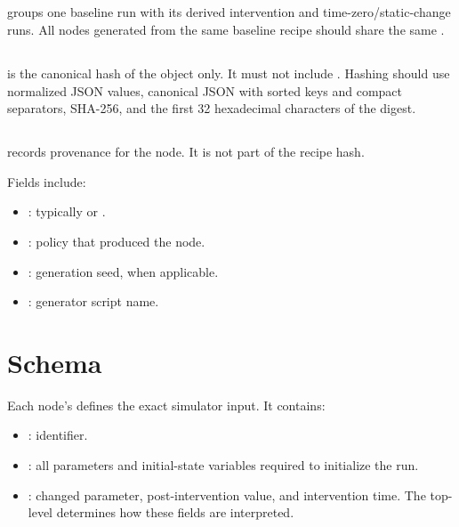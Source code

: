 \documentclass[11pt]{article}
\begin{document}
\subsection*{\texorpdfstring{}{family\_id}}

 groups one baseline run with its derived intervention and time-zero/static-change runs.
All nodes generated from the same baseline recipe should share the same .

\subsection*{\texorpdfstring{}{recipe\_hash}}

 is the canonical hash of the  object only.
It must not include .
Hashing should use normalized JSON values, canonical JSON with sorted keys and compact separators, SHA-256, and the first 32 hexadecimal characters of the digest.

\subsection*{\texorpdfstring{}{metadata}}

 records provenance for the node.
It is not part of the recipe hash.

Fields include:

\begin{itemize}
\item {}: typically  or .
\item {}: policy that produced the node.
\item {}: generation seed, when applicable.
\item {}: generator script name.
\end{itemize}

\section*{\texorpdfstring{}{recipe} Schema}

Each node's  defines the exact simulator input.
It contains:

\begin{itemize}
\item {}: \termSimulator identifier.
\item {}: all parameters and initial-state variables required to initialize the run.
\item {}: changed parameter, post-intervention value, and intervention time. The top-level  determines how these fields are interpreted.
\end{itemize}
\end{document}
